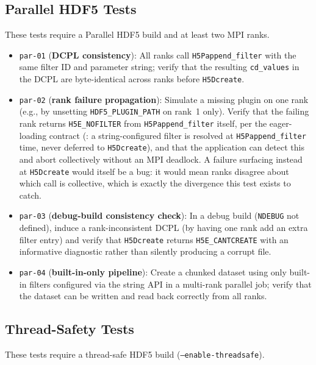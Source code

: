 \documentclass[../RFC-HDFG-2026-001.tex]{subfiles}
\begin{document}
\subsection{Parallel HDF5 Tests}
\label{sec:test-parallel}

These tests require a Parallel HDF5 build and at least two MPI ranks.

\begin{itemize}
\item \texttt{par-01} (\textbf{DCPL consistency}): All ranks call
  \texttt{H5Pappend\_filter} with the same filter ID and parameter string; verify
  that the resulting \texttt{cd\_values} in the DCPL are byte-identical across ranks
  before \texttt{H5Dcreate}.
\item \texttt{par-02} (\textbf{rank failure propagation}): Simulate a missing plugin
  on one rank (e.g., by unsetting \texttt{HDF5\_PLUGIN\_PATH} on rank~1 only).
  Verify that the failing rank returns \texttt{H5E\_NOFILTER} from
  \texttt{H5Pappend\_filter} itself, per the eager-loading contract
  (: a string-configured filter is resolved
  at \texttt{H5Pappend\_filter} time, never deferred to \texttt{H5Dcreate}),
  and that the application can detect this and abort collectively without
  an MPI deadlock.  A failure surfacing instead at \texttt{H5Dcreate} would
  itself be a bug: it would mean ranks disagree about which call is
  collective, which is exactly the divergence this test exists to catch.
\item \texttt{par-03} (\textbf{debug-build consistency check}): In a debug build
  (\texttt{NDEBUG} not defined), induce a rank-inconsistent DCPL (by having one rank
  add an extra filter entry) and verify that \texttt{H5Dcreate} returns
  \texttt{H5E\_CANTCREATE} with an informative diagnostic rather than silently
  producing a corrupt file.
\item \texttt{par-04} (\textbf{built-in-only pipeline}): Create a chunked dataset using
  only built-in filters configured via the string API in a multi-rank parallel
  job; verify that the dataset can be written and read back correctly from all
  ranks.
\end{itemize}


\subsection{Thread-Safety Tests}
\label{sec:test-threadsafety}

These tests require a thread-safe HDF5 build (\texttt{--enable-threadsafe}).
\end{document}
